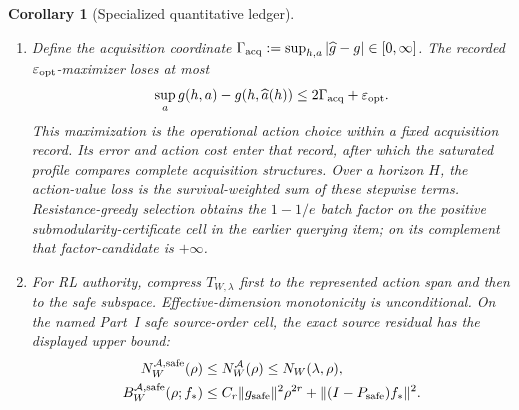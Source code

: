 \documentclass[11pt]{article}
\numberwithin{section}{part}
\theoremstyle{plain}
\newtheorem{corollary}[corollary]{Corollary}
\theoremstyle{definition}
\theoremstyle{remark}
\begin{document}
\begin{corollary}[Specialized quantitative ledger]
\begin{enumerate}[label=\textup{(\roman*)}]
\begin{equation}
 \le R_A\mathfrak q_T(A_W)
 \le\frac{R_A}{T}\sqrt{\operatorname{Tr}_{\rm seq}T_{W,\lambda}}
\end{equation}
where \(\operatorname{Tr}_{\rm seq}\) is the Part~I supremum of the finite
\(T\)-step path/tree compression traces.  For a fixed response this gives the
displayed bound; a selectable response uses the learned-operator sequential
cover, and the Bayesian branch uses the martingale PAC--Bayes term
\begin{equation}
 \label{eq:wick-martingale-pac-bayes}
 \frac{\mathrm{KL}_{E,W}^{\mathrm{str}}(Q)+\log(1/\delta)}{\xi T}
 +\frac{\xi}{8}.
\end{equation}
for its represented \(\xi>0\); other coefficient values are nonordinary.
The online regret bound is
\(2L_\ell T\sup_{\mathbf z}\mathfrak R_T^{\mathrm{seq}}\).  Each complementary
dependence cell uses its own Part~I candidate or the value \(+\infty\); a
dark space alone supplies no dependence coordinate.
\item Define the acquisition coordinate
\(\Gamma_{\rm acq}:=\sup_{h,a}|\widehat g-g|\in[0,\infty]\).  The recorded
\(\varepsilon_{\rm opt}\)-maximizer loses at most
\begin{equation}
 \label{eq:wick-active-score-loss}
 \sup_ag(h,a)-g(h,\widehat a(h))
 \le2\Gamma_{\rm acq}+\varepsilon_{\rm opt}.
\end{equation}
This maximization is the operational action choice within a fixed acquisition
record.  Its error and action cost enter that record, after which the
saturated profile compares complete acquisition structures.
Over a horizon \(H\), the action-value loss is the survival-weighted sum of
these stepwise terms.  Resistance-greedy selection obtains the \(1-1/e\)
batch factor on the positive submodularity-certificate cell in the earlier
querying item; on its complement that factor-candidate is \(+\infty\).
\item For RL authority, compress \(T_{W,\lambda}\) first to the represented
action span and then to the safe subspace.  Effective-dimension monotonicity
is unconditional.  On the named Part~I safe source-order cell, the exact
source residual has the displayed upper bound:
\begin{align}
 \label{eq:wick-safe-effective-dimension-order}
 N_W^{\mathcal A,{\rm safe}}(\rho)
 &\le N_W^{\mathcal A}(\rho)\le N_W(\lambda,\rho),\\
 \label{eq:wick-safe-source-residual}
 B_W^{\mathcal A,{\rm safe}}(\rho;f_*)
 &\le C_r\|g_{\rm safe}\|^2\rho^{2r}
 +\|(I-P_{\rm safe})f_*\|^2.

\end{align}
\end{enumerate}
\end{corollary}
\end{document}
